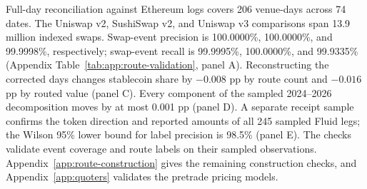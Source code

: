 Full-day reconciliation against Ethereum logs covers 206 venue-days across 74 dates. The Uniswap v2, SushiSwap v2, and Uniswap v3 comparisons span 13.9 million indexed swaps. Swap-event precision is 100.0000\%, 100.0000\%, and 99.9998\%, respectively; swap-event recall is 99.9995\%, 100.0000\%, and 99.9335\% (Appendix Table~\ref{tab:app:route-validation}, panel A). Reconstructing the corrected days changes stablecoin share by $-0.008$ pp by route count and $-0.016$ pp by routed value (panel C). Every component of the sampled 2024--2026 decomposition moves by at most 0.001 pp (panel D). A separate receipt sample confirms the token direction and reported amounts of all 245 sampled Fluid legs; the Wilson 95\% lower bound for label precision is 98.5\% (panel E). The checks validate event coverage and route labels on their sampled observations. Appendix~\ref{app:route-construction} gives the remaining construction checks, and Appendix~\ref{app:quoters} validates the pretrade pricing models.

